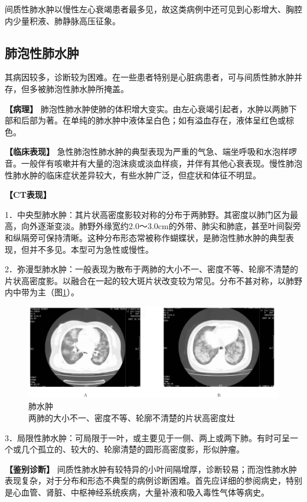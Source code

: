 间质性肺水肿以慢性左心衰竭患者最多见，故这类病例中还可见到心影增大、胸腔内少量积液、肺静脉高压征象。

\subsection{肺泡性肺水肿}

其病因较多，诊断较为困难。在一些患者特别是心脏病患者，可与间质性肺水肿并存，但多被肺泡性肺水肿所掩盖。

\textbf{【病理】}
肺泡性肺水肿使肺的体积增大变实。由左心衰竭引起者，水肿以两肺下部和后部为著。在单纯的肺水肿中液体呈白色；如有溢血存在，液体呈红色或棕色。

\textbf{【临床表现】}
急性肺泡性肺水肿的典型表现为严重的气急、端坐呼吸和水泡样啰音。一般伴有咳嗽并有大量的泡沫痰或淡血样痰，并伴有其他心衰表现。慢性肺泡性肺水肿的临床症状差异较大，有些水肿广泛，但症状和体征不明显。

\textbf{【CT表现】}

1．中央型肺水肿：其片状高密度影较对称的分布于两肺野。其密度以肺门区为最高，向外逐渐变淡。肺野外缘宽约2.0～3.0cm的外带、肺尖和肺底，甚至叶间裂旁和纵隔旁可保持清晰。这种分布形态常被称作蝴蝶状，是肺泡性肺水肿的典型表现，但并不多见。本型可为急性或慢性。

2．弥漫型肺水肿：一般表现为散布于两肺的大小不一、密度不等、轮廓不清楚的片状高密度影。以融合在一起的较大斑片状改变较为常见。分布不甚对称，以肺野内中带为主（图\ref{fig9-14}）。

\begin{figure}[!htbp]
 \centering
 \includegraphics[width=.7\textwidth,height=\textheight,keepaspectratio]{./images/Image00198.jpg}
 \captionsetup{justification=centering}
 \caption{肺水肿\\{\small 两肺的大小不一、密度不等、轮廓不清楚的片状高密度灶}}
 \label{fig9-14}
  \end{figure} 

3．局限性肺水肿：可局限于一叶，或主要见于一侧、两上或两下肺。有时可呈一个或几个孤立的、较大的、轮廓清楚的圆形高密度影，形似肿瘤。

\textbf{【鉴别诊断】}
间质性肺水肿有较特异的小叶间隔增厚，诊断较易；而泡性肺水肿表现复杂，对于分布和形态不典型的病例诊断困难。首先应详细的参阅病史，特别是心血管、肾脏、中枢神经系统疾病，大量补液和吸入毒性气体等病史。

